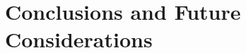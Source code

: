 \documentclass[conference]{IEEEtran}
\begin{document}

\fi

\section{Conclusions and Future Considerations}
\label{conclusion}
\end{document}
